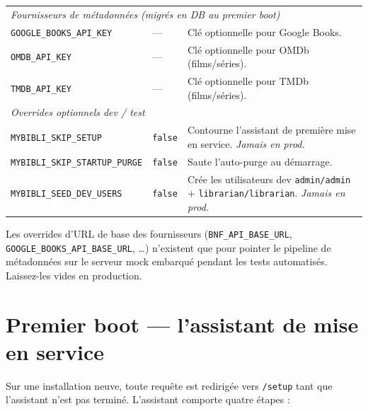{\begin{longtable}{l l >{\raggedright\arraybackslash}p{6.2cm}}
\midrule
\multicolumn{3}{l}{\emph{Fournisseurs de métadonnées (migrés en DB au premier boot)}} \\
\texttt{GOOGLE\_BOOKS\_API\_KEY} & --- & Clé optionnelle pour Google Books. \\
\texttt{OMDB\_API\_KEY}         & --- & Clé optionnelle pour OMDb (films/séries). \\
\texttt{TMDB\_API\_KEY}         & --- & Clé optionnelle pour TMDb (films/séries). \\
\midrule
\multicolumn{3}{l}{\emph{Overrides optionnels dev / test}} \\
\texttt{MYBIBLI\_SKIP\_SETUP}      & \texttt{false} & Contourne l'assistant de première mise en service. \emph{Jamais en prod.} \\
\texttt{MYBIBLI\_SKIP\_STARTUP\_PURGE} & \texttt{false} & Saute l'auto-purge au démarrage. \\
\texttt{MYBIBLI\_SEED\_DEV\_USERS} & \texttt{false} & Crée les utilisateurs dev \texttt{admin/admin} + \texttt{librarian/librarian}. \emph{Jamais en prod.} \\
\bottomrule
\end{longtable}
}

Les overrides d'URL de base des fournisseurs
(\texttt{BNF\_API\_BASE\_URL},
\texttt{GOOGLE\_BOOKS\_API\_BASE\_URL}, \dots) n'existent que pour
pointer le pipeline de métadonnées sur le serveur mock embarqué
pendant les tests automatisés. Laissez-les vides en production.

\section{Premier boot — l'assistant de mise en service}\label{sec:first-boot}

Sur une installation neuve, toute requête est redirigée vers
\texttt{/setup} tant que l'assistant n'est pas terminé. L'assistant comporte quatre étapes :

